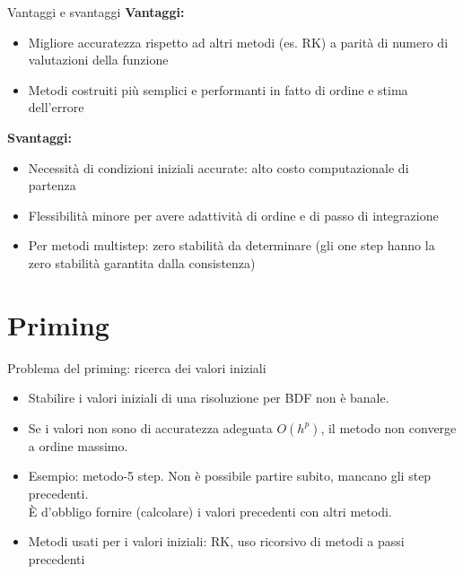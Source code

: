 \documentclass[aspectratio=169, 10pt, handout,usenames,dvipsnames]{beamer}
\begin{document}
    \begin{frame}{Vantaggi e svantaggi}
        \textbf{Vantaggi:}
        \begin{itemize}
            \item Migliore accuratezza rispetto ad altri metodi (es. RK) a parità di numero di valutazioni della funzione
            \item Metodi costruiti più semplici e performanti in fatto di ordine e stima dell’errore 
        \end{itemize}
        \textbf{Svantaggi:}
        \begin{itemize}
            \item Necessità di condizioni iniziali accurate: alto costo computazionale di partenza 
            \item Flessibilità minore per avere adattività di ordine e di passo di integrazione
            \item Per metodi multistep: zero stabilità da determinare (gli one step hanno la zero stabilità garantita dalla consistenza)
        \end{itemize}
    \end{frame}

\section{Priming}\label{sec:sec7}
    \begin{frame}{Problema del priming: ricerca dei valori iniziali}
        \begin{itemize}
            \item Stabilire i valori iniziali di una risoluzione per BDF non è banale.
            \item Se i valori non sono di accuratezza adeguata $O(h^p)$, il metodo non converge a ordine massimo.
            \item Esempio: metodo-5 step. Non è possibile partire subito, mancano gli step precedenti.\\ 
            È d'obbligo fornire (calcolare) i valori precedenti con altri metodi.
            \item Metodi usati per i valori iniziali: RK, uso ricorsivo di metodi a passi precedenti
        \end{itemize}   
    \end{frame}
    
\end{document}
